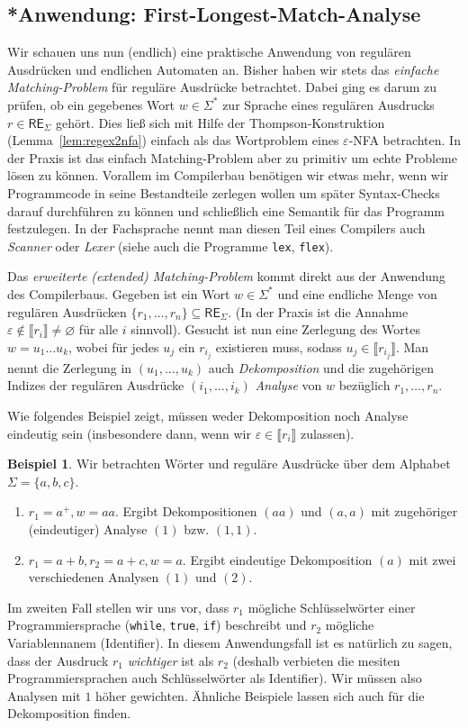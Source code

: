 \documentclass[11pt, a4paper]{article}
\theoremstyle{definition}
\newtheorem{example}[definition]{Beispiel}
\theoremstyle{plain}
\numberwithin{equation}{section}
\let\emptyset\varnothing
\begin{document}
\subsection{*Anwendung: First-Longest-Match-Analyse}\label{sec:regular_first-longest-match}
Wir schauen uns nun (endlich) eine praktische Anwendung von regulären Ausdrücken und endlichen Automaten an. Bisher haben wir stets das \textit{einfache Matching-Problem} für reguläre Ausdrücke betrachtet. Dabei ging es darum zu prüfen, ob ein gegebenes Wort $w \in \Sigma^\ast$ zur Sprache eines regulären Ausdrucks $r \in \mathsf{RE}_\Sigma$ gehört. Dies ließ sich mit Hilfe der Thompson-Konstruktion (Lemma~\ref{lem:regex2nfa}) einfach als das Wortproblem eines $\varepsilon$-NFA betrachten. In der Praxis ist das einfach Matching-Problem aber zu primitiv um echte Probleme lösen zu können. Vorallem im Compilerbau benötigen wir etwas mehr, wenn wir Programmcode in seine Bestandteile zerlegen wollen um später Syntax-Checks darauf durchführen zu können und schließlich eine Semantik für das Programm festzulegen. In der Fachsprache nennt man diesen Teil eines Compilers auch \textit{Scanner} oder \textit{Lexer} (siehe auch die Programme \texttt{lex}, \texttt{flex}).\par
Das \textit{erweiterte (extended) Matching-Problem} kommt direkt aus der Anwendung des Compilerbaus. Gegeben ist ein Wort $w \in \Sigma^\ast$ und eine endliche Menge von regulären Ausdrücken $\{r_1, \ldots, r_n\} \subseteq \mathsf{RE}_\Sigma$. (In der Praxis ist die Annahme $\varepsilon \notin \llbracket r_i \rrbracket \neq \emptyset$ für alle $i$ sinnvoll). Gesucht ist nun eine Zerlegung des Wortes $w = u_1 \ldots u_k$, wobei für jedes $u_j$ ein $r_{i_j}$ existieren muss, sodass $u_j \in \llbracket r_{i_j} \rrbracket$. Man nennt die Zerlegung in $(u_1, \ldots, u_k)$ auch \textit{Dekomposition} und die zugehörigen Indizes der regulären Ausdrücke $(i_1, \ldots, i_k)$ \textit{Analyse} von $w$ bezüglich $r_1, \ldots, r_n$.\par
Wie folgendes Beispiel zeigt, müssen weder Dekomposition noch Analyse eindeutig sein (insbesondere dann, wenn wir $\varepsilon \in \llbracket r_i \rrbracket$ zulassen).
\begin{example}
	Wir betrachten Wörter und reguläre Ausdrücke über dem Alphabet $\Sigma = \{a, b, c\}$.
	\begin{enumerate}[label=\arabic*)]
		\item $r_1 = a^+, w = aa$. Ergibt Dekompositionen $(aa)$ und $(a, a)$ mit zugehöriger (eindeutiger) Analyse $(1)$ bzw. $(1, 1)$.
		\item $r_1 = a+b, r_2 = a+c, w = a$. Ergibt eindeutige Dekomposition $(a)$ mit zwei verschiedenen Analysen $(1)$ und $(2)$.	
	\end{enumerate}
	Im zweiten Fall stellen wir uns vor, dass $r_1$ mögliche Schlüsselwörter einer Programmiersprache (\texttt{while}, \texttt{true}, \texttt{if}) beschreibt und $r_2$ mögliche Variablennanem (Identifier). In diesem Anwendungsfall ist es natürlich zu sagen, dass der Ausdruck $r_1$ \textit{wichtiger} ist als $r_2$ (deshalb verbieten die mesiten Programmiersprachen auch Schlüsselwörter als Identifier). Wir müssen also Analysen mit $1$ höher gewichten. Ähnliche Beispiele lassen sich auch für die Dekomposition finden.
\end{example}
\end{document}

